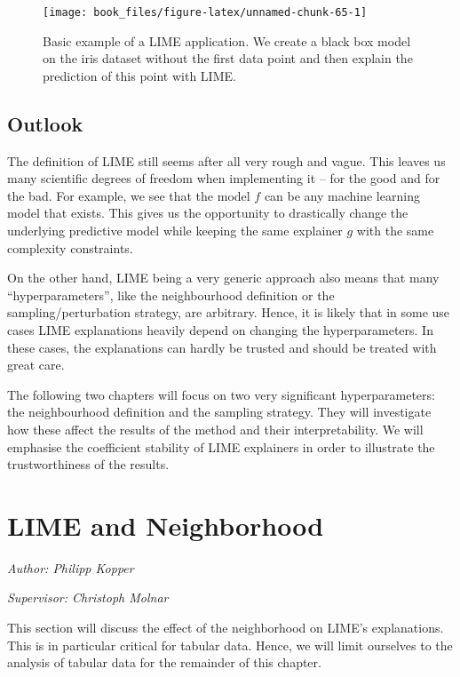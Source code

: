 \documentclass[]{krantz}
\begin{document}
\begin{figure}

{\centering \texttt{[image: book\_files/figure-latex/unnamed-chunk-65-1]} 

}

\caption{Basic example of a LIME application. We create a black box model on the iris dataset without the first data point and then explain the prediction of this point with LIME.}\label{fig:unnamed-chunk-65}
\end{figure}

\section{Outlook}\label{outlook-1}

The definition of LIME still seems after all very rough and vague. This
leaves us many scientific degrees of freedom when implementing it -- for
the good and for the bad. For example, we see that the model \(f\) can
be any machine learning model that exists. This gives us the opportunity
to drastically change the underlying predictive model while keeping the
same explainer \(g\) with the same complexity constraints.

On the other hand, LIME being a very generic approach also means that
many ``hyperparameters'', like the neighbourhood definition or the
sampling/perturbation strategy, are arbitrary. Hence, it is likely that
in some use cases LIME explanations heavily depend on changing the
hyperparameters. In these cases, the explanations can hardly be trusted
and should be treated with great care.

The following two chapters will focus on two very significant
hyperparameters: the neighbourhood definition and the sampling strategy.
They will investigate how these affect the results of the method and
their interpretability. We will emphasise the coefficient stability of
LIME explainers in order to illustrate the trustworthiness of the
results.

\chapter{LIME and Neighborhood}\label{lime-neighbor}

\emph{Author: Philipp Kopper}

\emph{Supervisor: Christoph Molnar}

This section will discuss the effect of the neighborhood on LIME's
explanations. This is in particular critical for tabular data. Hence, we
will limit ourselves to the analysis of tabular data for the remainder
of this chapter.
\end{document}
